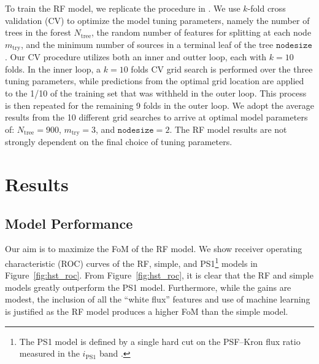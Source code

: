 \documentclass[twocolumn]{aastex63}
\begin{document}
To train the RF model, we replicate the procedure in \citet{Tachibana18}. We
use $k$-fold cross validation (CV) to optimize the model tuning parameters,
namely the number of trees in the forest $N_\mathrm{tree}$, the random number
of features for splitting at each node $m_\mathrm{try}$, and the minimum
number of sources in a terminal leaf of the tree $\mathtt{nodesize}$. Our CV
procedure utilizes both an inner and outter loop, each with $k = 10$ folds. In
the inner loop, a $k = 10$ folds CV grid search is performed over the three
tuning parameters, while predictions from the optimal grid location are
applied to the 1/10 of the training set that was withheld in the outer loop.
This process is then repeated for the remaining 9 folds in the outer loop. We
adopt the average results from the 10 different grid searches to arrive at
optimal model parameters of: $N_\mathrm{tree} = 900$, $m_\mathrm{try}
= 3$, and $\mathtt{nodesize} = 2$. The RF model results are not strongly
dependent on the final choice of tuning parameters.

\section{Results}\label{sec:results}

\subsection{Model Performance}

Our aim is to maximize the FoM of the RF model. We show receiver operating
characteristic (ROC) curves of the RF, simple, and PS1\footnote{The PS1 model
is defined by a single hard cut on the PSF--Kron flux ratio measured in the
$i_\mathrm{PS1}$ band \citep[for further details see][]{Tachibana18}.} models
in Figure~\ref{fig:hst_roc}. From Figure~\ref{fig:hst_roc}, it is clear that
the RF and simple models greatly outperform the PS1 model. Furthermore, while
the gains are modest, the inclusion of all the ``white flux'' features and use
of machine learning is justified as the RF model produces a higher FoM than
the simple model.
\end{document}
